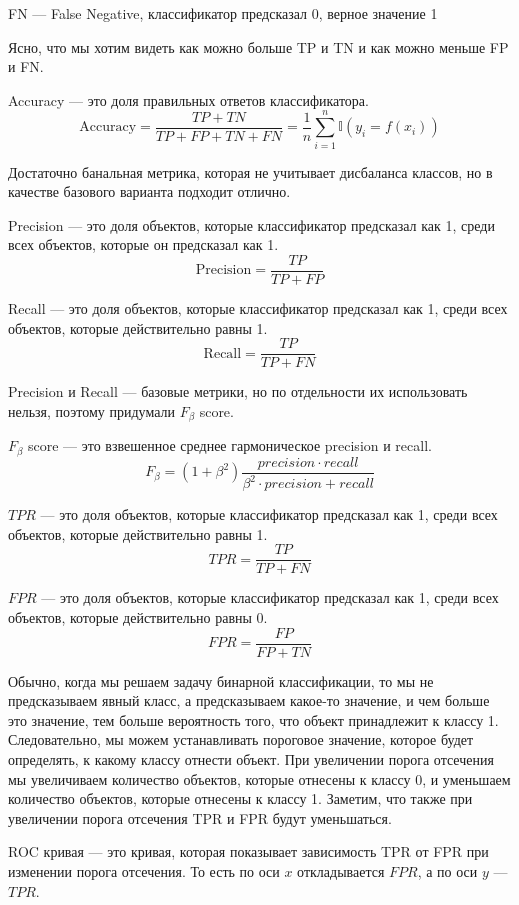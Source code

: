 FN --- False Negative, классификатор предсказал 0, верное значение 1


Ясно, что мы хотим видеть как можно больше TP и TN и как можно меньше FP и FN.

Accuracy --- это доля правильных ответов классификатора.
$$
    \text{Accuracy} = \frac{TP + TN}{TP + FP + TN + FN} = \frac{1}{n} \sum_{i=1}^n \mathbb{I}(y_i = f(x_i))
$$

Достаточно банальная метрика, которая не учитывает дисбаланса классов, но в качестве базового варианта подходит отлично.

Precision --- это доля объектов, которые классификатор предсказал как 1, среди всех объектов, которые он предсказал как 1.
$$
    \text{Precision} = \frac{TP}{TP + FP}
$$

Recall --- это доля объектов, которые классификатор предсказал как 1, среди всех объектов, которые действительно равны 1.
$$
    \text{Recall} = \frac{TP}{TP + FN}
$$

Precision и Recall --- базовые метрики, но по отдельности их использовать нельзя, поэтому придумали $F_{\beta}$ score.

$F_{\beta}$ score --- это взвешенное среднее гармоническое precision и recall.
$$
    F_{\beta} = (1 + \beta^2) \frac{precision \cdot recall}{\beta^2 \cdot precision + recall}
$$

$TPR$ --- это доля объектов, которые классификатор предсказал как 1, среди всех объектов, которые действительно равны 1.
$$
    TPR = \frac{TP}{TP + FN}
$$

$FPR$ --- это доля объектов, которые классификатор предсказал как 1, среди всех объектов, которые действительно равны 0.
$$
    FPR = \frac{FP}{FP + TN}
$$

Обычно, когда мы решаем задачу бинарной классификации, то мы не предсказываем явный класс, а предсказываем какое-то значение, и чем больше это значение, тем больше вероятность того, что объект принадлежит к классу 1.
Следовательно, мы можем устанавливать пороговое значение, которое будет определять, к какому классу отнести объект.
При увеличении порога отсечения мы увеличиваем количество объектов, которые отнесены к классу 0, и уменьшаем количество объектов, которые отнесены к классу 1.
Заметим, что также при увеличении порога отсечения TPR и FPR будут уменьшаться.

ROC кривая --- это кривая, которая показывает зависимость TPR от FPR при изменении порога отсечения. То есть по оси $x$ откладывается $FPR$, а по оси $y$ --- $TPR$.


